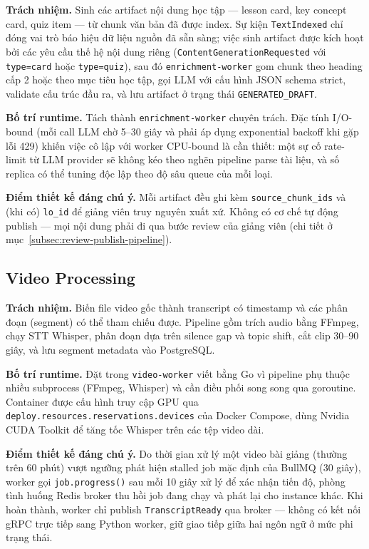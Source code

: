 \textbf{Trách nhiệm.} Sinh các artifact nội dung học tập --- lesson card,
key concept card, quiz item --- từ chunk văn bản đã được index. Sự kiện
\texttt{TextIndexed} chỉ đóng vai trò báo hiệu dữ liệu nguồn đã sẵn sàng;
việc sinh artifact được kích hoạt bởi các yêu cầu thế hệ nội dung riêng
(\texttt{ContentGenerationRequested} với \texttt{type=card} hoặc
\texttt{type=quiz}), sau đó \texttt{enrichment-worker} gom chunk theo
heading cấp 2 hoặc theo mục tiêu học tập, gọi LLM với cấu hình JSON schema
strict, validate cấu trúc đầu ra, và lưu artifact ở trạng thái
\texttt{GENERATED\_DRAFT}.

\textbf{Bố trí runtime.} Tách thành \texttt{enrichment-worker} chuyên trách.
Đặc tính I/O-bound (mỗi call LLM chờ 5--30 giây và phải áp dụng exponential
backoff khi gặp lỗi 429) khiến việc cô lập với worker CPU-bound là cần
thiết: một sự cố rate-limit từ LLM provider sẽ không kéo theo nghẽn pipeline
parse tài liệu, và số replica có thể tuning độc lập theo độ sâu queue của
mỗi loại.

\textbf{Điểm thiết kế đáng chú ý.} Mỗi artifact đều ghi kèm
\texttt{source\_chunk\_ids} và (khi có) \texttt{lo\_id} để giảng viên truy
nguyên xuất xứ. Không có cơ chế tự động publish --- mọi nội dung phải đi
qua bước review của giảng viên (chi tiết ở
mục~\ref{subsec:review-publish-pipeline}).

\subsection{Video Processing}

\textbf{Trách nhiệm.} Biến file video gốc thành transcript có timestamp và
các phân đoạn (segment) có thể tham chiếu được. Pipeline gồm trích audio
bằng FFmpeg, chạy STT Whisper, phân đoạn dựa trên silence gap và topic
shift, cắt clip 30--90 giây, và lưu segment metadata vào PostgreSQL.

\textbf{Bố trí runtime.} Đặt trong \texttt{video-worker} viết bằng Go vì
pipeline phụ thuộc nhiều subprocess (FFmpeg, Whisper) và cần điều phối
song song qua goroutine. Container được cấu hình truy cập GPU qua
\texttt{deploy.resources.reservations.devices} của Docker Compose, dùng
Nvidia CUDA Toolkit để tăng tốc Whisper trên các tệp video dài.

\textbf{Điểm thiết kế đáng chú ý.} Do thời gian xử lý một video bài giảng
(thường trên 60 phút) vượt ngưỡng phát hiện stalled job mặc định của
BullMQ (30 giây), worker gọi \texttt{job.progress()} sau mỗi 10 giây xử
lý để xác nhận tiến độ, phòng tình huống Redis broker thu hồi job đang
chạy và phát lại cho instance khác. Khi hoàn thành, worker chỉ publish
\texttt{TranscriptReady} qua broker --- không có kết nối gRPC trực tiếp
sang Python worker, giữ giao tiếp giữa hai ngôn ngữ ở mức phi trạng thái.

